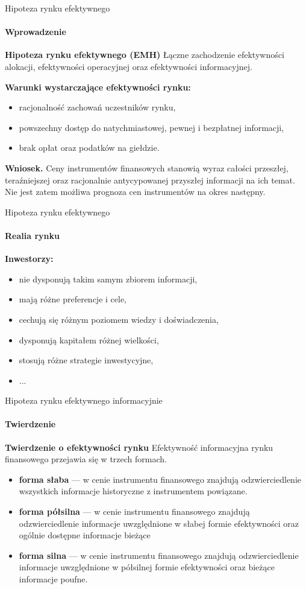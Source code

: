 \documentclass[a4paper, 11pt]{beamer}
\begin{document}
	\begin{frame}{Hipoteza rynku efektywnego}
		\framesubtitle{Wprowadzenie}
		\begin{block}{\textbf{Hipoteza rynku efektywnego (EMH)}}
			Łączne zachodzenie efektywności alokacji, efektywności operacyjnej oraz efektywności informacyjnej.
		\end{block}
		\textbf{Warunki wystarczające efektywności rynku:}
		\begin{itemize}
			\item racjonalność zachowań uczestników rynku,
			\item powszechny dostęp do natychmiastowej, pewnej i bezpłatnej informacji,
			\item brak opłat oraz podatków na giełdzie.
		\end{itemize}
		\begin{alert}{\textbf{Wniosek.}}
			Ceny instrumentów finansowych stanowią wyraz całości przeszłej, teraźniejszej oraz racjonalnie
			antycypowanej przyszłej informacji na ich temat. Nie jest zatem możliwa prognoza cen instrumentów
			na okres następny.
		\end{alert}
	\end{frame}
	
	\begin{frame}{Hipoteza rynku efektywnego}
		\framesubtitle{Realia rynku}
		\textbf{Inwestorzy:}
		\begin{itemize}
			\item nie dysponują takim samym zbiorem informacji,
			\item mają różne preferencje i cele,
			\item cechują się różnym poziomem wiedzy i doświadczenia,
			\item dysponują kapitałem różnej wielkości,
			\item stosują różne strategie inwestycyjne,
			\item ...
		\end{itemize}
	\end{frame}
	
	\begin{frame}{Hipoteza rynku efektywnego informacyjnie}
		\framesubtitle{Twierdzenie}
		\begin{block}{\textbf{Twierdzenie o efektywności rynku}}
			Efektywność informacyjna rynku finansowego przejawia się w trzech formach.
			\begin{itemize}
				\item \textbf{forma słaba} --- w cenie instrumentu finansowego znajdują
					odzwierciedlenie wszystkich informacje historyczne z instrumentem powiązane.
				\item \textbf{forma półsilna} --- w cenie instrumentu finansowego znajdują
					odzwierciedlenie informacje uwzględnione w słabej formie efektywności oraz
					ogólnie dostępne informacje bieżące
				\item \textbf{forma silna} --- w cenie instrumentu finansowego znajdują
					odzwierciedlenie informacje uwzględnione w półsilnej formie efektywności oraz
					bieżące informacje poufne.
			\end{itemize}
		\end{block}
	\end{frame}
	
\end{document}
